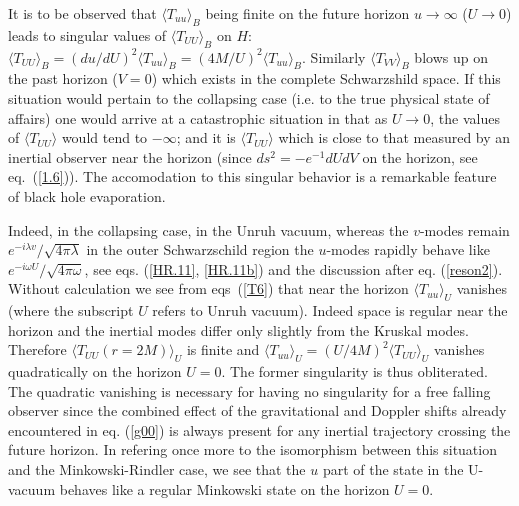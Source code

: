 \documentclass[12pt,oneside]{report}
\begin{document}
It is to be observed that $\langle T_{uu} \rangle_B$ being finite on the future
horizon $u \to \infty$ ($ U \to 0$) leads to singular values of $\langle T_{UU}
\rangle_B$ on $H$: $\langle T_{UU} \rangle_B = (du / dU )^2 \langle T_{uu}
\rangle_B = (4M/U)^{2} \langle T_{uu} \rangle_B$. Similarly $\langle T_{VV}
\rangle_B$ blows up on the past horizon ($V=0$) which exists in the complete
Schwarzshild space. If this situation would pertain to the collapsing case (i.e.
to the true physical state of affairs) one would arrive at a catastrophic
situation in that as $U \to 0$, the values of $\langle T_{UU} \rangle$ would
tend to $-\infty$; and it is $\langle T_{UU} \rangle$ which is close to that
measured by an inertial observer near the horizon (since $ds^2 = - e^{-1} dU dV$
on the horizon, see eq.~(\ref{1.6})). The accomodation to this singular behavior
is a remarkable feature of black hole evaporation.

Indeed, in the collapsing case, in the Unruh vacuum, whereas the $v$-modes remain
$ e ^{-i \lambda v}/ \sqrt{4 \pi \lambda}$ in the outer Schwarzschild region
 the $u$-modes rapidly behave like $ e^{-i\omega U}/ \sqrt{4 \pi
\omega}$, see eqs.  (\ref{HR.11}, \ref{HR.11b}) and the discussion after eq.
(\ref{reson2}). Without  calculation we see from eqs~(\ref{T6}) that near the horizon
$\langle T_{uu}\rangle_U$ vanishes (where the subscript $U$ refers to Unruh
vacuum). Indeed space is regular near the horizon and the inertial modes differ
only slightly from the Kruskal modes. Therefore $ \langle T_ {UU}({r = 2M})
\rangle _U $ is finite and $\langle T_{uu}\rangle_U =({U/ 4M})^2 \langle
T_{UU}\rangle _U$ vanishes quadratically on the horizon $U=0$. The former
singularity is thus  obliterated. The quadratic vanishing is necessary for
having no singularity for a free falling observer since  the combined effect of
the gravitational  and  Doppler shifts already encountered in eq.
(\ref{g00}) is always present for any inertial trajectory crossing the future
horizon.  In refering once more to the isomorphism between this situation and 
the Minkowski-Rindler case, we see that the $u$ part of the state in the 
U-vacuum behaves like a regular Minkowski state on the horizon $U=0$. 
\end{document}
